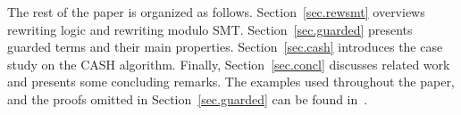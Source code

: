 The rest of the paper is organized as
follows. Section~\ref{sec.rewsmt} overviews rewriting logic and
rewriting modulo SMT. Section~\ref{sec.guarded} presents guarded terms
and %
their main properties. Section~\ref{sec.cash}
introduces the case study on the CASH algorithm. Finally,
Section~\ref{sec.concl} discusses related work and presents some
concluding remarks. The examples %
used throughout the paper, and the proofs omitted in
Section~\ref{sec.guarded} can be found
in~\cite{bae-noteguardedterms-2017}.